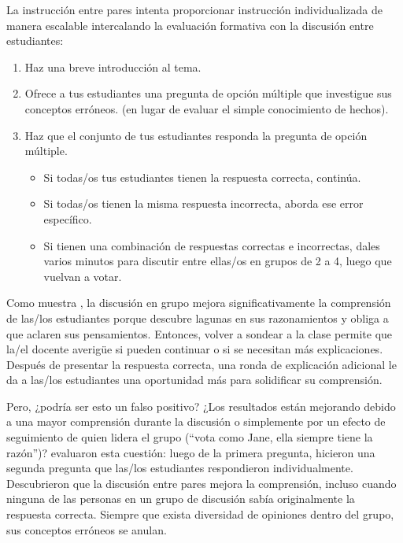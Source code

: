 La instrucción entre pares intenta proporcionar instrucción individualizada de manera escalable
intercalando la evaluación formativa con la discusión entre estudiantes:

\begin{enumerate}

\item
  Haz una breve introducción al tema.

\item
  Ofrece a tus estudiantes una pregunta de opción múltiple que investigue sus conceptos erróneos.
  (en lugar de evaluar el simple conocimiento de hechos).

\item
  Haz que el conjunto de tus estudiantes responda la pregunta de opción múltiple.

  \begin{itemize}

  \item
    Si todas/os tus estudiantes tienen la respuesta correcta, continúa.

  \item
    Si todas/os tienen la misma respuesta incorrecta,
    aborda ese error específico.

  \item
    Si tienen una combinación de respuestas correctas e incorrectas,
    dales varios minutos para discutir entre ellas/os en grupos de 2 a 4,
    luego que vuelvan a votar.

  \end{itemize}

\end{enumerate}

Como muestra
,
la discusión en grupo mejora significativamente la comprensión de las/los estudiantes
porque descubre lagunas en sus razonamientos y obliga a que aclaren sus pensamientos.
Entonces, volver a sondear a la clase permite que la/el docente averigüe si pueden continuar
o si se necesitan más explicaciones.
Después de presentar la respuesta correcta,
una ronda de explicación adicional le da a las/los estudiantes una oportunidad más para solidificar su comprensión.

Pero, ¿podría ser esto un falso positivo?
¿Los resultados están mejorando debido a una mayor comprensión durante la discusión
o simplemente por un efecto de seguimiento de quien lidera el grupo (``vota como Jane, ella siempre tiene la razón'')?
\cite{Smit2009} evaluaron esta cuestión: luego de la primera pregunta,
hicieron una segunda pregunta
que las/los estudiantes respondieron individualmente.
Descubrieron que la discusión entre pares mejora la comprensión,
incluso cuando ninguna de las personas en un grupo de discusión sabía originalmente la respuesta correcta.
Siempre que exista diversidad de opiniones dentro del grupo,
sus conceptos erróneos se anulan.

